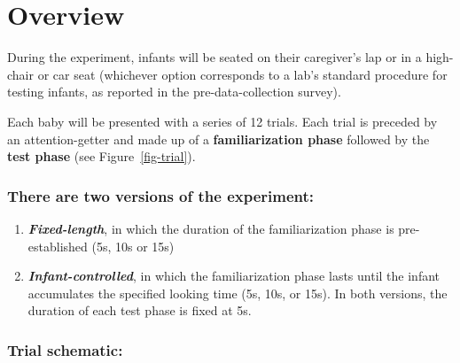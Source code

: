 \documentclass[
  letterpaper,
  DIV=11,
  numbers=noendperiod,
  oneside]{scrreprt}
\providecommand{\tightlist}{%
  \setlength{\itemsep}{0pt}\setlength{\parskip}{0pt}}
\begin{document}
\section{Overview}\label{overview-2}

During the experiment, infants will be seated on their caregiver's lap
or in a high-chair or car seat (whichever option corresponds to a lab's
standard procedure for testing infants, as reported in the
pre-data-collection survey).

Each baby will be presented with a series of 12 trials. Each trial is
preceded by an attention-getter and made up of a \textbf{familiarization
phase} followed by the \textbf{test phase} (see Figure~\ref{fig-trial}).

\subsubsection[There are two versions of the
experiment:]{\texorpdfstring{There are two versions of the
experiment:}{There are two versions of the experiment:}}\label{there-are-two-versions-of-the-experimentprocedure-1}

\begin{enumerate}
\def\labelenumi{\arabic{enumi}.}
\tightlist
\item
  \textbf{\emph{Fixed-length}}, in which the duration of the
  familiarization phase is pre-established (5s, 10s or 15s)
\item
  \textbf{\emph{Infant-controlled}}, in which the familiarization phase
  lasts until the infant accumulates the specified looking time (5s,
  10s, or 15s). In both versions, the duration of each test phase is
  fixed at 5s.
\end{enumerate}

\subsubsection{Trial schematic:}\label{trial-schematic}
\end{document}
